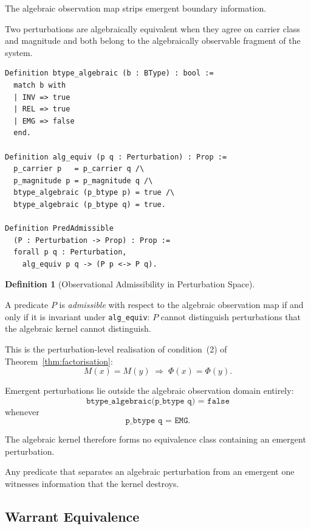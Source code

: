 \documentclass[12pt]{article}
\theoremstyle{plain}
\theoremstyle{definition}
\newtheorem{definition}[theorem]{Definition}
\theoremstyle{remark}
\begin{document}
The algebraic observation map strips emergent boundary information.

Two perturbations are algebraically equivalent when they agree on
carrier class and magnitude and both belong to the algebraically
observable fragment of the system.

\begin{lstlisting}[style=rocq,
caption={Algebraic equivalence and predicate admissibility.}]
Definition btype_algebraic (b : BType) : bool :=
  match b with
  | INV => true
  | REL => true
  | EMG => false
  end.

Definition alg_equiv (p q : Perturbation) : Prop :=
  p_carrier p   = p_carrier q /\
  p_magnitude p = p_magnitude q /\
  btype_algebraic (p_btype p) = true /\
  btype_algebraic (p_btype q) = true.

Definition PredAdmissible
  (P : Perturbation -> Prop) : Prop :=
  forall p q : Perturbation,
    alg_equiv p q -> (P p <-> P q).
\end{lstlisting}

\begin{definition}[Observational Admissibility in Perturbation Space]
\label{def:pred-admissible}

A predicate $P$ is \emph{admissible} with respect to the algebraic
observation map if and only if it is invariant under
\texttt{alg\_equiv}: $P$ cannot distinguish perturbations that the
algebraic kernel cannot distinguish.

This is the perturbation-level realisation of condition~(2) of
Theorem~\ref{thm:factorisation}:
\[
M(x) = M(y)
\;\Rightarrow\;
\Phi(x) = \Phi(y).
\]

\end{definition}

Emergent perturbations lie outside the algebraic observation domain
entirely:
\[
\texttt{btype\_algebraic(p\_btype q) = false}
\]
whenever
\[
\texttt{p\_btype q = EMG}.
\]

The algebraic kernel therefore forms no equivalence class containing
an emergent perturbation.

Any predicate that separates an algebraic perturbation from an
emergent one witnesses information that the kernel destroys.

\subsection{Warrant Equivalence}
\end{document}
